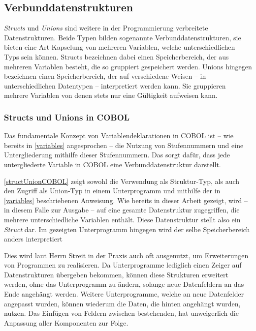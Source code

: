 \subsection{Verbunddatenstrukturen}\label{verbunddatenstrukturen}
\textit{Structs} und \textit{Unions} sind weitere in der Programmierung verbreitete Datenstrukturen. Beide Typen bilden sogenannte Verbunddatenstrukturen, \dahe sie bieten eine Art Kapselung von mehreren Variablen, welche unterschiedlichen Typs sein können. Structs bezeichnen dabei einen Speicherbereich, der aus mehreren Variablen besteht, die so gruppiert gespeichert werden. Unions hingegen bezeichnen einen Speicherbereich, der auf verschiedene Weisen -- in unterschiedlichen Datentypen -- interpretiert werden kann. Sie gruppieren mehrere Variablen von denen stets nur eine Gültigkeit aufweisen kann.

\subsubsection*{Structs und Unions in COBOL}

Das fundamentale Konzept von Variablendeklarationen in COBOL ist -- wie bereits in \autoref{variables} angesprochen -- die Nutzung von Stufennummern und eine Untergliederung mithilfe dieser Stufennummern. Das sorgt dafür, dass jede untergliederte Variable in COBOL eine Verbunddatenstruktur darstellt.


\autoref{structUnionCOBOL} zeigt sowohl die Verwendung als Struktur-Typ, als auch den Zugriff als Union-Typ in einem Unterprogramm und mithilfe der in \autoref{variables} beschriebenen  Anweisung. Wie bereits in dieser Arbeit gezeigt, wird -- in diesem Falle zur Ausgabe -- auf eine gesamte Datenstruktur zugegriffen, die mehrere unterschiedliche Variablen enthält. Diese Datenstruktur stellt also ein \textit{Struct} dar. Im gezeigten Unterprogramm hingegen wird der selbe Speicherbereich anders interpretiert

Dies wird laut Herrn Streit in der Praxis auch oft ausgenutzt, um Erweiterungen von Programmen zu realisieren. Da Unterprogramme lediglich einen Zeiger auf Datenstrukturen übergeben bekommen, können diese Strukturen erweitert werden, ohne das Unterprogramm zu ändern, solange neue Datenfeldern an das Ende angehängt werden. Weitere Unterprogramme, welche an neue Datenfelder angepasst wurden, können wiederum die Daten, die hinten angehängt wurden, nutzen. Das Einfügen von Feldern zwischen bestehenden, hat unweigerlich die Anpassung aller Komponenten zur Folge.

